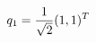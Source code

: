 \documentclass[preview]{standalone}
\begin{document}
\begin{align*}
\special{dvisvgm:raw <g id='unique000'>}q_1=\dfrac{1}{\sqrt2}(1,1)^T\special{dvisvgm:raw </g>}
\end{align*}
\end{document}
